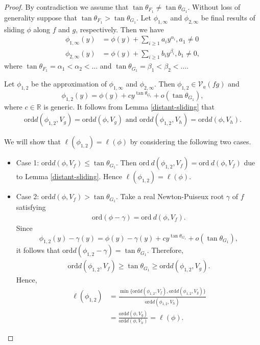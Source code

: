 \documentclass[reqno, 12pt ,a4letter]{amsart}
\theoremstyle{definition}
\begin{document}
	\begin{proof}
    By contradiction we assume that $\tan\theta_{F_1} \neq \tan\theta_{G_1}.$ Without loss of generality suppose that $\tan\theta_{F_1} > \tan\theta_{G_1}.$ Let $\phi_{1,\infty}$ and $\phi_{2,\infty}$ be final results of sliding $\phi$ along $f$ and $g$, respectively. Then we have 
	\begin{align}
		\phi_{1,\infty}(y) &= \phi(y) + \sum_{i \ge 1}a_iy^{\alpha_i}, a_1\neq 0\\
		\phi_{2,\infty}(y) &= \phi(y) + \sum_{i \ge 1}b_iy^{\beta_i}, b_1\neq 0,
	\end{align}
	where $\tan\theta_{F_1}=\alpha_1 <\alpha_2 < \ldots$ and $\tan\theta_{G_1} =\beta_1 < \beta_2 <
    \ldots $.
    
    Let $\phi_{1,2}$ be the approximation of $\phi_{1,\infty}$ and $\phi_{2,\infty}$. Then $\phi_{1,2}\in \mathcal{V}_a(fg)$ and
	$$ \phi_{1,2}(y) = \phi(y) + cy^{\tan\theta_{G_1}} + o(\tan\theta_{G_1}), $$ where $c \in \mathbb{R}$ is generic. It follows from Lemma \ref{distant-sliding} that
    	\begin{align}\label{order-with-Vg}
    		\mathrm{ord}d(\phi_{1,2}, V_g) = \mathrm{ord}d(\phi, V_g) \text{ and } \mathrm{ord}d(\phi_{1,2}, V_h) = \mathrm{ord}d(\phi, V_h).
    	\end{align}
    	 
We will show that $\ell(\phi_{1,2})=\ell(\phi)$ by considering the following two cases.

\begin{itemize}
	\item Case 1: 	$\mathrm{ord}d(\phi, V_f) \leq \tan\theta_{G_1}$. Then $\mathrm{ord}\ d(\phi_{1,2}, V_f) = \mathrm{ord}\ d(\phi, V_f)$ due to Lemma \ref{distant-sliding}. Hence $\ell(\phi_{1,2})=\ell(\phi)$.
    
	\item Case 2: $\mathrm{ord}d(\phi, V_f) > \tan\theta_{G_1}$. Take a real Newton-Puiseux root $\gamma$ of $f$ satisfying
	\begin{align*}
		\mathrm{ord}(\phi - \gamma) = \mathrm{ord}\ d(\phi, V_f).
	\end{align*}
    Since
    $$ \phi_{1,2}(y)- \gamma(y) =\phi(y)-\gamma(y) + cy^{\tan\theta_{G_1}} + o(\tan\theta_{G_1}), $$
     it follows that $\mathrm{ord}d(\phi_{1,2} - \gamma) = \tan\theta_{G_1}$. Therefore,
	\begin{align}\label{order-with-Vf-tan}
		\mathrm{ord}d(\phi_{1,2}, V_f) \ge \tan\theta_{G_1}\ge \mathrm{ord}d(\phi_{1,2}, V_g).
	\end{align}
	Hence,
	  		\begin{align*}
			\ell(\phi_{1,2}) &= \frac{\min\{\mathrm{ord}d(\phi_{1,2},V_f), \mathrm{ord}d(\phi_{1,2},V_g)\}}{\mathrm{ord}d(\phi_{1,2},V_h)} \\
			&= \frac{ \mathrm{ord}d(\phi,V_g) }{\mathrm{ord}d(\phi,V_h)}  =\ell(\phi).
		\end{align*} 
		

\end{itemize}
\end{proof}
\end{document}
